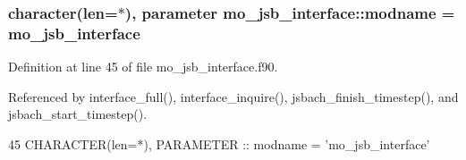 \subsubsection[{modname}]{\setlength{\rightskip}{0pt plus 5cm}character(len=$\ast$), parameter mo\+\_\+jsb\+\_\+interface\+::modname = \textquotesingle{}mo\+\_\+jsb\+\_\+interface\textquotesingle{}}\label{namespacemo__jsb__interface_a4b120a12931c3fa9318b7a3421f3e919}


Definition at line 45 of file mo\+\_\+jsb\+\_\+interface.\+f90.



Referenced by interface\+\_\+full(), interface\+\_\+inquire(), jsbach\+\_\+finish\+\_\+timestep(), and jsbach\+\_\+start\+\_\+timestep().


\begin{DoxyCode}
45   \textcolor{keywordtype}{CHARACTER(len=*)}, \textcolor{keywordtype}{PARAMETER} :: modname = \textcolor{stringliteral}{'mo\_jsb\_interface'}
\end{DoxyCode}
